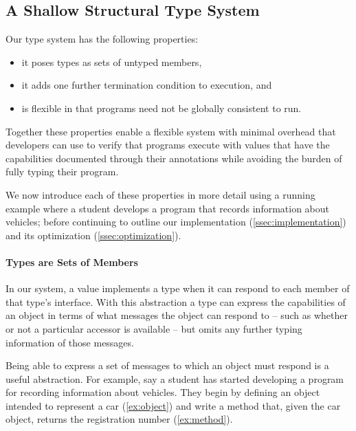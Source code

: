 \subsection{A Shallow Structural Type System}


Our type system has the following properties:

\begin{itemize}
    \item it poses types as sets of untyped members,
    \item it adds one further termination condition to execution, and 
    \item is flexible in that programs need not be globally consistent to run.
\end{itemize}

Together these properties enable a flexible system
with minimal overhead
that developers can use to verify that programs 
execute with values that have the capabilities 
documented through their annotations 
while avoiding the burden of fully typing their program. 

We now introduce each of these properties in more detail
using a running example where a student develops
a program that records information about vehicles; 
before continuing to outline
our implementation (\cref{ssec:implementation})
and its optimization (\cref{ssec:optimization}).

\paragraph{Types are Sets of Members}

In our system, a value implements a type when it
can respond to each member of that type's interface.
With this abstraction a type can express the capabilities
of an object in terms of what messages the object can respond to 
-- such as whether or not a particular accessor is available --
but omits any further typing information of those messages.

Being able to express a set of messages to which an object
must respond is a useful abstraction. For example, 
say a student has started developing a program for recording
information about vehicles. They begin by defining an object
intended to represent a car (\cref{ex:object}) and write a method that, 
given the car object,
returns the registration number (\cref{ex:method}).

